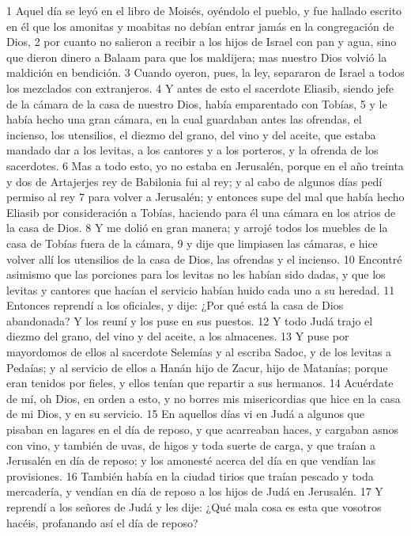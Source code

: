 1 Aquel día se leyó en el libro de Moisés, oyéndolo el pueblo, y fue hallado escrito en él que los amonitas y moabitas no debían entrar jamás en la congregación de Dios,
2 por cuanto no salieron a recibir a los hijos de Israel con pan y agua, sino que dieron dinero a Balaam para que los maldijera; mas nuestro Dios volvió la maldición en bendición. 
3 Cuando oyeron, pues, la ley, separaron de Israel a todos los mezclados con extranjeros.
4 Y antes de esto el sacerdote Eliasib, siendo jefe de la cámara de la casa de nuestro Dios, había emparentado con Tobías,
5 y le había hecho una gran cámara, en la cual guardaban antes las ofrendas, el incienso, los utensilios, el diezmo del grano, del vino y del aceite, que estaba mandado dar a los levitas, a los cantores y a los porteros, y la ofrenda de los sacerdotes.
6 Mas a todo esto, yo no estaba en Jerusalén, porque en el año treinta y dos de Artajerjes rey de Babilonia fui al rey; y al cabo de algunos días pedí permiso al rey
7 para volver a Jerusalén; y entonces supe del mal que había hecho Eliasib por consideración a Tobías, haciendo para él una cámara en los atrios de la casa de Dios.
8 Y me dolió en gran manera; y arrojé todos los muebles de la casa de Tobías fuera de la cámara,
9 y dije que limpiasen las cámaras, e hice volver allí los utensilios de la casa de Dios, las ofrendas y el incienso.
10 Encontré asimismo que las porciones para los levitas no les habían sido dadas, y que los levitas y cantores que hacían el servicio habían huido cada uno a su heredad.
11 Entonces reprendí a los oficiales, y dije: ¿Por qué está la casa de Dios abandonada? Y los reuní y los puse en sus puestos.
12 Y todo Judá trajo el diezmo del grano, del vino y del aceite, a los almacenes. 
13 Y puse por mayordomos de ellos al sacerdote Selemías y al escriba Sadoc, y de los levitas a Pedaías; y al servicio de ellos a Hanán hijo de Zacur, hijo de Matanías; porque eran tenidos por fieles, y ellos tenían que repartir a sus hermanos.
14 Acuérdate de mí, oh Dios, en orden a esto, y no borres mis misericordias que hice en la casa de mi Dios, y en su servicio.
15 En aquellos días vi en Judá a algunos que pisaban en lagares en el día de reposo, y que acarreaban haces, y cargaban asnos con vino, y también de uvas, de higos y toda suerte de carga, y que traían a Jerusalén en día de reposo; y los amonesté acerca del día en que vendían las provisiones.
16 También había en la ciudad tirios que traían pescado y toda mercadería, y vendían en día de reposo a los hijos de Judá en Jerusalén. 
17 Y reprendí a los señores de Judá y les dije: ¿Qué mala cosa es esta que vosotros hacéis, profanando así el día de reposo?
